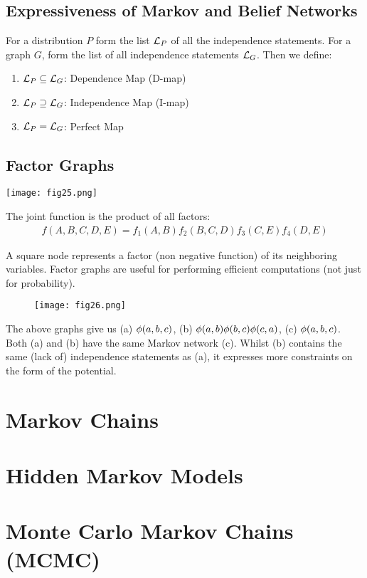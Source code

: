 \subsection{Expressiveness of Markov and Belief Networks}

For a distribution $P$ form the list $\mathcal{L}_P$ of all the independence statements. For a graph $G$, form the list of all independence statements $\mathcal{L}_G$. Then we define:
\begin{enumerate}
	\item $\mathcal{L}_P\subseteq\mathcal{L}_G$: Dependence Map (D-map)
	\item $\mathcal{L}_P\supseteq\mathcal{L}_G$: Independence Map (I-map)
	\item $\mathcal{L}_P=\mathcal{L}_G$: Perfect Map
\end{enumerate}

\subsection{Factor Graphs}

\begin{minipage}{0.4\textwidth}
	\centering
	\texttt{[image: fig25.png]}
\end{minipage}
\begin{minipage}{0.6\textwidth}
	The joint function is the product of all factors:
	\begin{align*}
	f(A,B,C,D,E)=f_1(A,B)f_2(B,C,D)f_3(C,E)f_4(D,E)
	\end{align*}
\end{minipage}
A square node represents a factor (non negative function) of its neighboring variables. Factor graphs are useful for performing efficient computations (not just for probability).
\begin{figure*}[h]
	\centering
	\texttt{[image: fig26.png]}
\end{figure*}
The above graphs give us (a) $\phi(a,b,c)$, (b) $\phi(a,b)\phi(b,c)\phi(c,a)$, (c) $\phi(a,b,c)$. Both (a) and (b) have the same Markov network (c). Whilst (b) contains the same (lack of) independence statements as (a), it expresses more constraints on the form of the potential.

\section{Markov Chains}

\section{Hidden Markov Models}

\section{Monte Carlo Markov Chains (MCMC)}